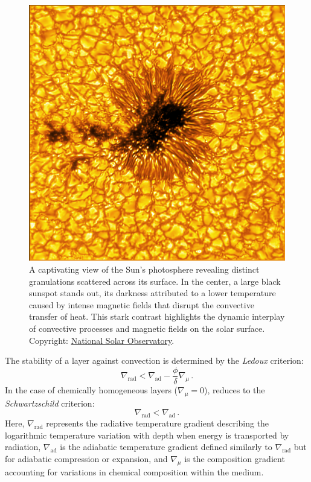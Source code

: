 \documentclass[main.tex]{subfiles}
\begin{document}
    \begin{figure}[ht!]
        \centering
        \includegraphics[scale=0.4]{figures/chapter1/sun_granulation.png}
        \caption{A captivating view of the Sun's photosphere revealing distinct granulations scattered across its surface. In the center, a large black sunspot stands out, its darkness attributed to a lower temperature caused by intense magnetic fields that disrupt the convective transfer of heat. This stark contrast highlights the dynamic interplay of convective processes and magnetic fields on the solar surface. Copyright: \href{https://nso.edu/}{National Solar Observatory}.}
        \label{fig:sun_granulation}
    \end{figure}

    The stability of a layer against convection is determined by the \textit{Ledoux} criterion:
    \begin{equation}\label{eq:ledoux}
        \nabla_{\text{rad}} < \nabla_{\text{ad}} - \frac{\phi}{\delta} \nabla_{\mu}\,.
    \end{equation}
    In the case of chemically homogeneous layers ($\nabla_{\mu} = 0$), reduces to the \emph{Schwartzschild} criterion:	
    \begin{equation}\label{eq:schwarzschild}
        \nabla_{\text{rad}} < \nabla_{\text{ad}}\,.
    \end{equation}
    Here, $\nabla_\mathrm{rad}$ represents the radiative temperature gradient describing the logarithmic temperature variation with depth when energy is transported by radiation, $\nabla_\mathrm{ad}$ is the adiabatic temperature gradient defined similarly to $\nabla_\mathrm{rad}$ but for adiabatic compression or expansion, and $\nabla_\mu$ is the composition gradient accounting for variations in chemical composition within the medium.
    
\end{document}
